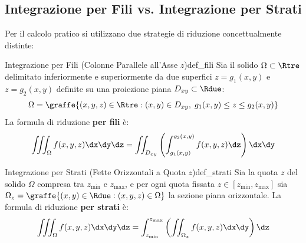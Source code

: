 \subsection{Integrazione per Fili vs. Integrazione per Strati}

Per il calcolo pratico si utilizzano due strategie di riduzione concettualmente distinte:

\begin{definizione}{Integrazione per Fili (Colonne Parallele all'Asse $z$)}{def_fili}
Sia il solido $\Omega \subset \Rtre$ delimitato inferiormente e superiormente da due superfici $z = g_1(x,y)$ e $z = g_2(x,y)$ definite su una proiezione piana $D_{xy} \subset \Rdue$:
\[
\Omega = \graffe{(x,y,z) \in \Rtre : (x,y) \in D_{xy}, \; g_1(x,y) \le z \le g_2(x,y)}
\]
La formula di riduzione \textbf{per fili} è:
\[
\iiint_\Omega f(x,y,z) \dx\dy\dz = \iint_{D_{xy}} \left( \int_{g_1(x,y)}^{g_2(x,y)} f(x,y,z) \dz \right) \dx\dy
\]
\end{definizione}

\begin{definizione}{Integrazione per Strati (Fette Orizzontali a Quota $z$)}{def_strati}
Sia la quota $z$ del solido $\Omega$ compresa tra $z_{\min}$ e $z_{\max}$, e per ogni quota fissata $z \in [z_{\min}, z_{\max}]$ sia $\Omega_z = \graffe{(x,y) \in \Rdue : (x,y,z) \in \Omega}$ la sezione piana orizzontale. La formula di riduzione \textbf{per strati} è:
\[
\iiint_\Omega f(x,y,z) \dx\dy\dz = \int_{z_{\min}}^{z_{\max}} \left( \iint_{\Omega_z} f(x,y,z) \dx\dy \right) \dz
\]
\end{definizione}

